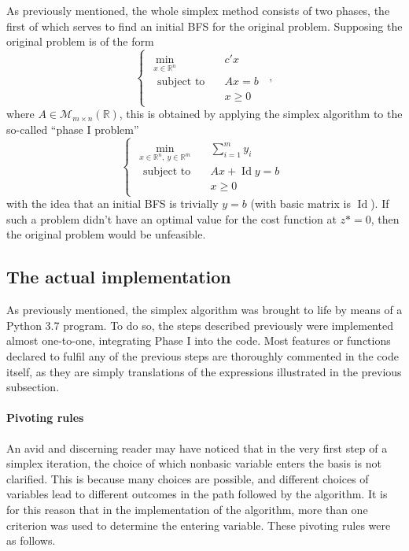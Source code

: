 \documentclass[a4paper]{article}
\DeclareMathOperator{\Id}{Id}
\begin{document}
As previously mentioned, the whole simplex method consists of two phases, the first of which serves to find an initial BFS for the original problem. Supposing the original problem is of the form
\begin{equation*}
\begin{cases}
\begin{aligned}
    \min\limits_{x\in\mathbb{R}^n} \quad &\! c'x\\[2ex]
    \text{ subject to}\quad
    &\! Ax = b\\
    &x \ge 0
\end{aligned}
\end{cases}
\,,
\end{equation*}
where $A\in\mathcal{M}_{m\times n}(\mathbb{R})$, this is obtained by applying the simplex algorithm to the so-called ``phase I problem''
\begin{equation*}
\begin{cases}
\begin{aligned}
    \min\limits_{x\in \mathbb{R}^n,\ y\in\mathbb{R}^m} \quad &\! \sum_{i = 1}^{m} y_i\\[2ex]
    \text{ subject to}\quad
    &\! Ax + \Id y = b\\
    &x \ge 0
\end{aligned}
\end{cases}
\end{equation*}
with the idea that an initial BFS is trivially $y = b$ (with basic matrix is $\Id$). If such a problem didn't have an optimal value for the cost function at ${z}{*}=0$, then the original problem would be unfeasible.

\subsection{The actual implementation}

As previously mentioned, the simplex algorithm was brought to life by means of a Python 3.7 program. To do so, the steps described previously were implemented almost one-to-one, integrating Phase I into the code. Most features or functions declared to fulfil any of the previous steps are thoroughly commented in the code itself, as they are simply translations of the expressions illustrated in the previous subsection.

\paragraph{Pivoting rules} An avid and discerning reader may have noticed that in the very first step of a simplex iteration, the choice of which nonbasic variable enters the basis is not clarified. This is because many choices are possible, and different choices of variables lead to different outcomes in the path followed by the algorithm. It is for this reason that in the implementation of the algorithm, more than one criterion was used to determine the entering variable. These pivoting rules were as follows.
\end{document}
